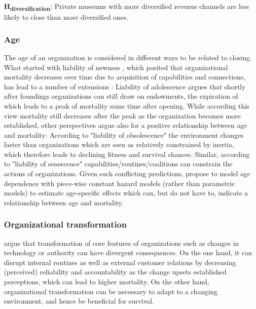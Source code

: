 \documentclass[11pt]{article}
\begin{document}
\bigbreak
\noindent
\textbf{H\textsubscript{diversification}}: Private museums with more diversified revenue channels are less likely to close than more diversified ones.

\subsubsection*{Age}



The age of an organization is considered in different ways to be related to closing.
What started with liability of newness \parencite{Stinchcombe_1965_structure}, which posited that organizational mortality decreases over time due to acquisition of capabilities and connections, has lead to a number of extensions \parencite{Carroll_Khessina_2019_demography,Hannan_1998_mortality}:
Liability of adolescence argues that shortly after foundings organizations can still draw on endowments, the expiration of which leads to a peak of mortality some time after opening.
While according this view mortality still decreases after the peak as the organization becomes more established, other perspectives argue also for a positive relationship between age and mortality:
According to "liability of obsolescence" the environment changes faster than organizations which are seen as relatively constrained by inertia, which therefore leads to declining fitness and survival chances.
Similar, according to "liability of senescence" capabilities/routines/coalitions can constrain the actions of organizations.
Given such conflicting predictions, \textcite{Carroll_Khessina_2019_demography} propose to model age dependence with piece-wise constant hazard models (rather than parametric models) to estimate age-specific effects which can, but do not have to, indicate a relationship between age and mortality.



\subsubsection*{Organizational transformation}

\textcite{Carroll_Khessina_2019_demography} argue that transformation of core features of organizations such as changes in technology or authority can have divergent consequences. 
On the one hand, it can disrupt internal routines as well as external customer relations by decreasing (perceived) reliability and accountability as the change upsets established perceptions, which can lead to higher mortality. 
On the other hand, organizational transformation can be necessary to adapt to a changing environment, and hence be beneficial for survival.
\end{document}
